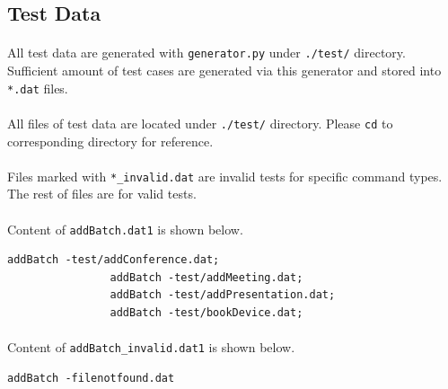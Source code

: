 \documentclass{article}
\begin{document}
        \subsection{Test Data}
            \paragraph{}
                All test data are generated with \texttt{generator.py} under \texttt{./test/}
                directory. Sufficient amount of test cases are generated via this generator
                and stored into \texttt{*.dat} files.
            \paragraph{}
                All files of test data are located under \texttt{./test/} directory. Please
                \texttt{cd} to corresponding directory for reference.
            \paragraph{}
                Files marked with \texttt{*\_invalid.dat} are invalid tests for specific command
                types. The rest of files are for valid tests.
            \paragraph{}
                Content of \texttt{addBatch.dat1} is shown below.
            \begin{Verbatim}[gobble=8]
                addBatch -test/addConference.dat;
                addBatch -test/addMeeting.dat;
                addBatch -test/addPresentation.dat;
                addBatch -test/bookDevice.dat;
            \end{Verbatim}
            \paragraph{}
                Content of \texttt{addBatch\_invalid.dat1} is shown below.
            \begin{Verbatim}[gobble=8]
                addBatch -filenotfound.dat
            \end{Verbatim}
\end{document}
